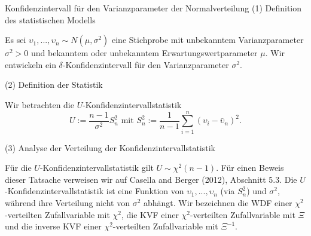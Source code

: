 \documentclass[
  8pt,
  ignorenonframetext,
]{beamer}
\newcommand{\ups} {\upsilon}
\begin{document}
\begin{frame}{Konfidenzintervall für den Varianzparameter der
Normalverteilung}
\protect\hypertarget{konfidenzintervall-fuxfcr-den-varianzparameter-der-normalverteilung}{}
\noindent (1) Definition des statistischen Modells

\small

Es sei \(\ups_1,...,\ups_n \sim N(\mu,\sigma^2)\) eine Stichprobe mit
unbekanntem Varianzparameter \(\sigma^2 > 0\) und bekanntem oder
unbekanntem Erwartungswertparameter \(\mu\). Wir entwickeln ein
\(\delta\)-Konfidenzintervall für den Varianzparameter \(\sigma^2\).

\normalsize

\noindent (2) Definition der Statistik

\small

Wir betrachten die \(U\)-Konfidenzintervallstatistik \begin{equation}
U := \frac{n-1}{\sigma^2}S^2_n \mbox{ mit } S^2_n := \frac{1}{n-1}\sum_{i=1}^n \left(\ups_i - \bar{\ups}_n\right)^2.
\end{equation}

\normalsize

\noindent (3) Analyse der Verteilung der Konfidenzintervallstatistik

\small

Für die \(U\)-Konfidenzintervallstatistik gilt \(U \sim \chi^2(n-1)\).
Für einen Beweis dieser Tatsache verweisen wir auf Casella and Berger
(2012), Abschnitt 5.3. Die \(U\)-Konfidenzintervallstatistik ist eine
Funktion von \(\ups_1,...,\ups_n\) (via \(S^2_n\)) und \(\sigma^2\),
während ihre Verteilung nicht von \(\sigma^2\) abhängt. Wir bezeichnen
die WDF einer \(\chi^2\)-verteilten Zufallvariable mit \(\chi^2\), die
KVF einer \(\chi^2\)-verteilten Zufallvariable mit \(\Xi\) und die
inverse KVF einer \(\chi^2\)-verteilten Zufallvariable mit \(\Xi^{-1}\).
\end{frame}
\end{document}
